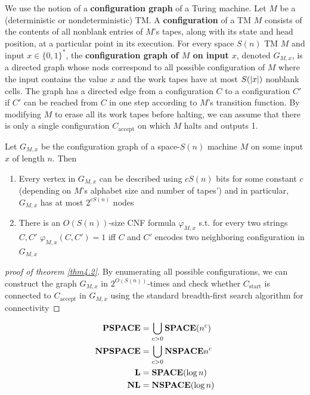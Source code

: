 \documentclass[11pt]{article}
\def \SPACE {\textbf{SPACE}}
\def \PSPACE {\textbf{PSPACE}}
\def \NPSPACE {\textbf{NPSPACE}}
\def \NSPACE {\textbf{NSPACE}}
\def \NL {\textbf{NL}}
\def \start {\text{start}}
\def \accept {\text{accept}}
\begin{document}
We use the notion of a \textbf{configuration graph} of a Turing machine. Let \(M\) be a (deterministic or
nondeterministic) TM. A \textbf{configuration} of a TM \(M\) consists of the contents of all nonblank
entries of \(M\)'s tapes, along with its state and head position, at a particular point in its
execution. For every space \(S(n)\) TM \(M\) and input \(x\in\{0,1\}^*\), the
\textbf{configuration graph of \(M\) on input \(x\)}, denoted \(G_{M,x}\), is a directed graph whose nods
correspond to all possible configuration of \(M\) where the input contains the value \(x\) and
the work tapes have at most \(S(\abs{x})\) nonblank cells. The graph has a directed edge from a
configuration \(C\) to a configuration \(C'\) if \(C'\) can be reached from \(C\) in one step
according to \(M\)'s transition function. By modifying \(M\) to erase all its work tapes before
halting, we can assume that there is only a single configuration \(C_{\accept}\) on which \(M\)
halts and outputs 1.

\begin{claim}
\label{claim4.4}
Let \(G_{M,x}\) be the configuration graph of a space-\(S(n)\) machine \(M\) on some
 input \(x\) of length \(n\). Then
\begin{enumerate}
\item Every vertex in \(G_{M,x}\) can be described using \(cS(n)\) bits for some constant \(c\)
(depending on \(M\)'s alphabet size and number of tapes') and in particular, \(G_{M,x}\) has
at most \(2^{cS(n)}\) nodes
\item There is an \(O(S(n))\)-size CNF formula \(\varphi_{M,x}\) s.t. for every two
strings \(C,C'\) \(\varphi_{M,x}(C,C')=1\) iff \(C\) and \(C'\) encodes two neighboring
configuration in \(G_{M,x}\)
\end{enumerate}
\end{claim}

\begin{proof}[proof of theorem \ref{thm4.2}]
By enumerating all possible configurations, we can construct the graph \(G_{M,x}\)
in \(2^{O(S(n))}\)-times  and check whether \(C_{\start}\) is connected to \(C_{\accept}\)
in \(G_{M,x}\) using the standard breadth-first search algorithm for connectivity
\end{proof}

\begin{definition}[]
\begin{align*}
\PSPACE&=\bigcup_{c>0}\SPACE(n^c)\\
\NPSPACE&=\bigcup_{c>0}\NSPACE{n^c}\\
\bL&=\SPACE(\log n)\\
\NL&=\NSPACE(\log n)
\end{align*}
\end{definition}
\end{document}
